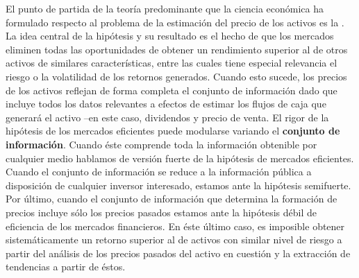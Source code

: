\documentclass{nuevotema}
\begin{document}
El punto de partida de la teoría predominante que la ciencia económica ha formulado respecto al problema de la estimación del precio de los activos es la . La idea central de la hipótesis y su resultado es el hecho de que los mercados eliminen todas las oportunidades de obtener un rendimiento superior al de otros activos de similares características, entre las cuales tiene especial relevancia el riesgo o la volatilidad de los retornos generados. Cuando esto sucede, los precios de los activos reflejan de forma completa el conjunto de información dado que incluye todos los datos relevantes a efectos de estimar los flujos de caja que generará el activo --en este caso, dividendos y precio de venta. El rigor de la hipótesis de los mercados eficientes puede modularse variando el \textbf{conjunto de información}. Cuando éste comprende toda la información obtenible por cualquier medio hablamos de versión fuerte de la hipótesis de mercados eficientes. Cuando el conjunto de información se reduce a la información pública a disposición de cualquier inversor interesado, estamos ante la hipótesis semifuerte. Por último, cuando el conjunto de información que determina la formación de precios incluye sólo los precios pasados estamos ante la hipótesis débil de eficiencia de los mercados financieros. En éste último caso, es imposible obtener sistemáticamente un retorno superior al de activos con similar nivel de riesgo a partir del análisis de los precios pasados del activo en cuestión y la extracción de tendencias a partir de éstos.
\end{document}
